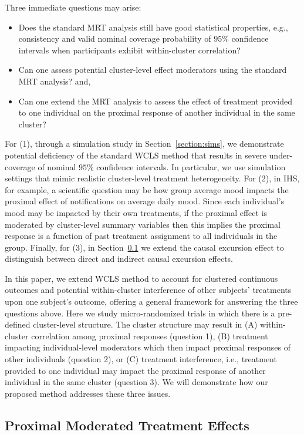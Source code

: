 \documentclass[12pt]{article}
\begin{document}
Three immediate questions may arise:
\begin{itemize}
    \item[(1)] Does the standard MRT analysis still have good statistical properties, e.g., consistency and valid nominal coverage probability of $95\%$ confidence intervals when participants exhibit within-cluster correlation?
    \item[(2)] Can one assess potential cluster-level effect moderators using the standard MRT analysis? and,
    \item[(3)] Can one extend the MRT analysis to assess the effect of treatment provided to one individual on the proximal response of another individual in the same cluster?
\end{itemize}
  For (1), through a simulation study in Section~\ref{section:sims}, we demonstrate potential deficiency of the standard WCLS method that results in severe under-coverage of nominal $95\%$ confidence intervals. In particular, we use simulation settings that mimic realistic cluster-level treatment heterogeneity.  For (2), in IHS, for example, a scientific question may be how group average mood impacts the proximal effect of notifications on average daily mood.  Since each individual's mood may be impacted by their own treatments, if the proximal effect is moderated by cluster-level summary variables then this implies the proximal response is a function of past treatment assignment to all individuals in the group.  Finally, for (3), in Section~\ref{section:prox_effects_pot_outcome} we extend the causal excursion effect to distinguish between direct and indirect causal excursion effects.

In this paper, we extend WCLS method \citep{Boruvkaetal} to  account for clustered continuous outcomes and potential within-cluster interference of other subjects' treatments upon one subject's outcome, offering a general framework for answering the three questions above. Here we study micro-randomized trials in which there is a pre-defined cluster-level structure.  The cluster structure may result in (A) within-cluster correlation among proximal responses (question 1), (B) treatment impacting individual-level moderators which then impact proximal responses of other individuals (question 2), or (C) treatment interference, i.e., treatment provided to one individual may impact the proximal response of another individual in the same cluster (question 3).  We will demonstrate how our proposed method addresses these three issues.


\subsection{Proximal Moderated Treatment Effects}
\label{section:prox_effects_pot_outcome}
\end{document}
